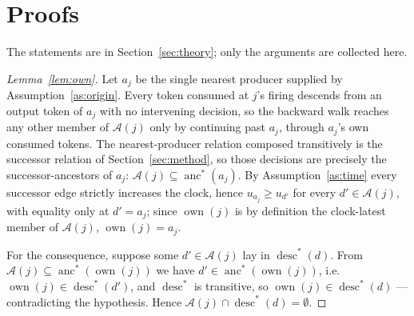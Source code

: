 \documentclass[review,authoryear,3p,times]{elsarticle}
\newcommand{\Ascr}{\mathcal{A}}
\newcommand{\desc}{\operatorname{desc}}
\newcommand{\anc}{\operatorname{anc}}
\newcommand{\own}{\operatorname{own}}
\begin{document}
\clearpage
\appendix
\section{Proofs}
\label{app:proofs}

The statements are in Section~\ref{sec:theory}; only the arguments are
collected here.

\begin{proof}[Lemma~\ref{lem:own}]
Let $a_j$ be the single nearest producer supplied by
Assumption~\ref{as:origin}. Every token consumed at $j$'s firing descends from
an output token of $a_j$ with no intervening decision, so the backward walk
reaches any other member of $\Ascr(j)$ only by continuing past $a_j$, through
$a_j$'s own consumed tokens. The nearest-producer relation composed
transitively is the successor relation of Section~\ref{sec:method}, so those
decisions are precisely the successor-ancestors of $a_j$:
$\Ascr(j)\subseteq\anc^{*}(a_j)$. By Assumption~\ref{as:time} every successor
edge strictly increases the clock, hence $u_{a_j}\ge u_{d'}$ for every
$d'\in\Ascr(j)$, with equality only at $d'=a_j$; since $\own(j)$ is by
definition the clock-latest member of $\Ascr(j)$, $\own(j)=a_j$.

For the consequence, suppose some $d'\in\Ascr(j)$ lay in $\desc^{*}(d)$. From
$\Ascr(j)\subseteq\anc^{*}(\own(j))$ we have $d'\in\anc^{*}(\own(j))$, i.e.\
$\own(j)\in\desc^{*}(d')$, and $\desc^{*}$ is transitive, so
$\own(j)\in\desc^{*}(d)$ --- contradicting the hypothesis. Hence
$\Ascr(j)\cap\desc^{*}(d)=\emptyset$.
\end{proof}
\end{document}
